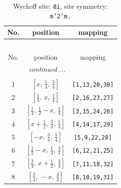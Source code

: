 \documentclass[fleqn,8pt]{jsarticle}
\begin{document}
\begin{longtable}{ccc}
\caption{Wyckoff site: {\tt 8i}, site symmetry: {\tt m'2'm.}}
 \\
 \hline \hline
No. & position & mapping \\ \hline \endfirsthead

\multicolumn{2}{l}{\tablename\ \thetable{}} \\
 \hline \hline
No. & position & mapping \\ \hline \endhead

 \hline \hline
\multicolumn{2}{r}{\footnotesize\it continued ...} \\ \endfoot

 \hline \hline
\multicolumn{2}{r}{} \\ \endlastfoot

1 & $\left[ x,\, \frac{1}{4},\, \frac{3}{4} \right]$ & {\tt [1,13,20,30]} \\ \hline
2 & $\left[ \frac{1}{4},\, x,\, \frac{1}{4} \right]$ & {\tt [2,16,23,27]} \\ \hline
3 & $\left[ \frac{1}{4},\, \frac{1}{2} - x,\, \frac{1}{4} \right]$ & {\tt [3,15,24,26]} \\ \hline
4 & $\left[ x + \frac{1}{2},\, \frac{3}{4},\, \frac{1}{4} \right]$ & {\tt [4,14,17,29]} \\ \hline
5 & $\left[ - x,\, \frac{3}{4},\, \frac{1}{4} \right]$ & {\tt [5,9,22,28]} \\ \hline
6 & $\left[ \frac{1}{2} - x,\, \frac{1}{4},\, \frac{3}{4} \right]$ & {\tt [6,12,21,25]} \\ \hline
7 & $\left[ \frac{3}{4},\, x + \frac{1}{2},\, \frac{3}{4} \right]$ & {\tt [7,11,18,32]} \\ \hline
8 & $\left[ \frac{3}{4},\, - x,\, \frac{3}{4} \right]$ & {\tt [8,10,19,31]} \\
\end{longtable}
\renewcommand{\arraystretch}{1.2}
\end{document}
